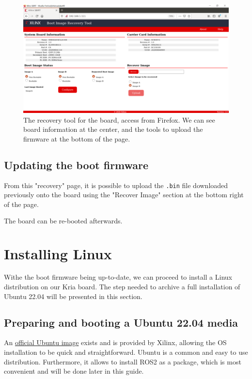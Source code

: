 \documentclass[10pt]{article}
\begin{document}
\begin{figure}[htbp]
\centering
\includegraphics[width=1\textwidth]{img/recovery.png}
\caption{\label{fig:org16012b5}The recovery tool for the board, access from Firefox. We can see board information at the center, and the tools to upload the firmware at the bottom of the page.}
\end{figure}

\subsection{Updating the boot firmware}
\label{sec:org61bb6b7}
From this "recovery" page, it is possible to upload the \texttt{.bin} file downloaded previously onto
the board using the "Recover Image" section at the bottom right of the page.

The board can be re-booted afterwards.

\section{Installing Linux}
\label{sec:org594a767}
Withe the boot firmware being up-to-date, we can proceed to install a Linux distribution
on our Kria board. The step needed to archive a full installation of Ubuntu 22.04
will be presented in this section.

\subsection{Preparing and booting a Ubuntu 22.04 media}
\label{sec:org988029c}
An \href{https://ubuntu.com/download/amd-xilinx}{official Ubuntu image} exists and is
provided by Xilinx, allowing the OS installation to be quick and
straightforward.
Ubuntu is a common and easy to use distribution. Furthermore,
it allows to install ROS2 as a package, which is most convenient and will be
done later in this guide.
\end{document}
